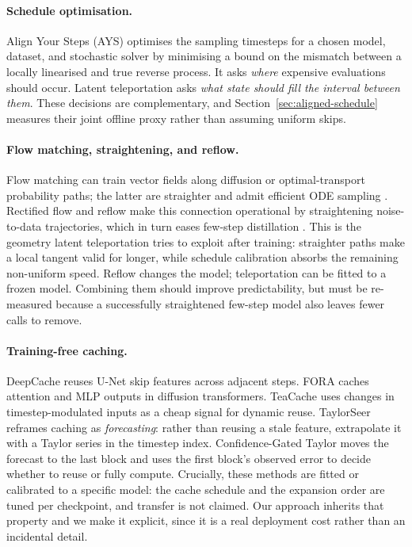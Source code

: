\documentclass[11pt,a4paper]{article}
\begin{document}
\paragraph{Schedule optimisation.}
Align Your Steps (AYS) \citep{sabour2024align} optimises the sampling timesteps
for a chosen model, dataset, and stochastic solver by minimising a bound on the
mismatch between a locally linearised and true reverse process. It asks
\emph{where} expensive evaluations should occur. Latent teleportation asks
\emph{what state should fill the interval between them}. These decisions are
complementary, and Section~\ref{sec:aligned-schedule} measures their joint
offline proxy rather than assuming uniform skips.

\paragraph{Flow matching, straightening, and reflow.}
Flow matching can train vector fields along diffusion or optimal-transport
probability paths; the latter are straighter and admit efficient ODE sampling
\citep{lipman2023flow}. Rectified flow and reflow make this connection
operational by straightening noise-to-data trajectories, which in turn eases
few-step distillation \citep{liu2023rectified,liu2024instaflow}. This is the
geometry latent teleportation tries to exploit after training: straighter paths
make a local tangent valid for longer, while schedule calibration absorbs the
remaining non-uniform speed. Reflow changes the model; teleportation can be
fitted to a frozen model. Combining them should improve predictability, but
must be re-measured because a successfully straightened few-step model also
leaves fewer calls to remove.

\paragraph{Training-free caching.}
DeepCache \citep{ma2024deepcache} reuses U-Net skip features across adjacent
steps. FORA \citep{selvaraju2024fora} caches attention and MLP outputs in
diffusion transformers. TeaCache \citep{liu2024teacache} uses changes in
timestep-modulated inputs as a cheap signal for dynamic reuse. TaylorSeer
\citep{liu2025taylorseer} reframes caching as \emph{forecasting}: rather than
reusing a stale feature, extrapolate it with a Taylor series in the timestep
index. Confidence-Gated Taylor \citep{guan2025cgtaylor} moves the forecast to
the last block and uses the first block's observed error to decide whether to
reuse or fully compute. Crucially, these methods are fitted or calibrated to a
specific model: the cache
schedule and the expansion order are tuned per checkpoint, and transfer is not
claimed. Our approach inherits that property and we make it explicit, since it
is a real deployment cost rather than an incidental detail.
\end{document}

